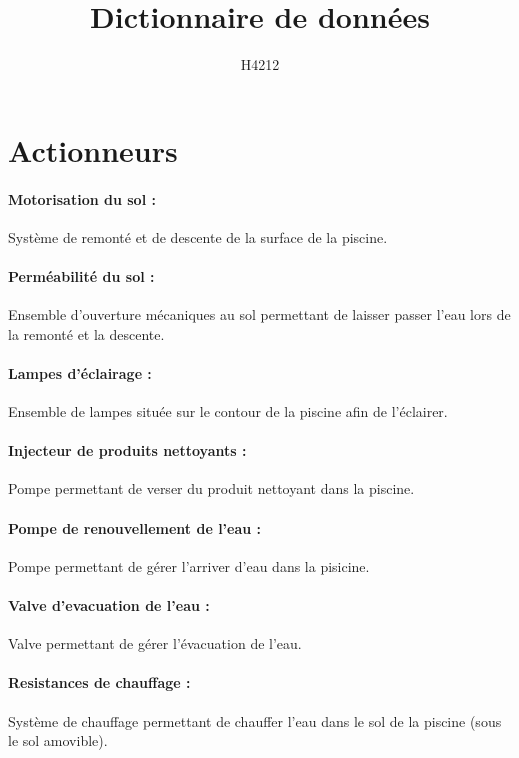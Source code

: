 \documentclass[a4paper,11pt]{article}
\title{Dictionnaire de données}
\author{H4212}
\begin{document}
\maketitle
\newpage

\section{Actionneurs}

    \paragraph{Motorisation du sol :}
        Système de remonté et de descente de la surface de la piscine.

    \paragraph{Perméabilité du sol :}
        Ensemble d'ouverture mécaniques au sol permettant de laisser passer l'eau lors de la remonté et la descente.

    \paragraph{Lampes d'éclairage :}
        Ensemble de lampes située sur le contour de la piscine afin de l'éclairer.

    \paragraph{Injecteur de produits nettoyants :}
	    Pompe permettant de verser du produit nettoyant dans la piscine.

    \paragraph{Pompe de renouvellement de l'eau :}
	    Pompe permettant de gérer l'arriver d'eau dans la pisicine.

    \paragraph{Valve d'evacuation de l'eau :}
	    Valve permettant de gérer l'évacuation de l'eau.

    \paragraph{Resistances de chauffage :}
        Système de chauffage permettant de chauffer l'eau dans le sol de la piscine (sous le sol amovible).
\end{document}
